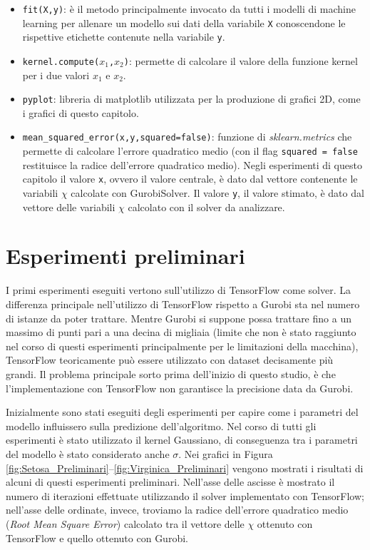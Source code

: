\documentclass[a4paper,12pt]{report}
\begin{document}
\begin{itemize}
\begin{itemize}
    \end{itemize}
    \item \texttt{fit(X,y)}: è il metodo principalmente invocato da tutti i modelli di machine learning per allenare un modello sui dati della variabile \texttt{X} conoscendone le rispettive etichette contenute nella variabile \texttt{y}.
    \item \texttt{kernel.compute($x_{1}$,$x_{2}$)}: permette di calcolare il valore della funzione kernel per i due valori $x_{1}$ e $x_{2}$.
    \item \texttt{pyplot}: libreria di matplotlib utilizzata per la produzione di grafici 2D, come i grafici di questo capitolo.
    \item \texttt{mean\_squared\_error(x,y,squared=false)}: funzione di \textit{sklearn.metrics} che permette di calcolare l'errore quadratico medio (con il flag \texttt{squared = false} restituisce la radice dell'errore quadratico medio). Negli esperimenti di questo capitolo il valore \texttt{x}, ovvero il valore centrale, è dato dal vettore contenente le variabili $\chi$ calcolate con GurobiSolver. Il valore \texttt{y}, il valore stimato, è dato dal vettore delle variabili $\chi$ calcolato con il solver da analizzare.
\end{itemize}

\section{Esperimenti preliminari}
I primi esperimenti eseguiti vertono sull'utilizzo di TensorFlow come solver. La differenza principale nell'utilizzo di TensorFlow rispetto a Gurobi sta nel numero di istanze da poter trattare. Mentre Gurobi si suppone possa trattare fino a un massimo di punti pari a una decina di migliaia (limite che non è stato raggiunto nel corso di questi esperimenti principalmente per le limitazioni della macchina), TensorFlow teoricamente può essere utilizzato con dataset decisamente più grandi. Il problema principale sorto prima dell'inizio di questo studio, è che l'implementazione con TensorFlow non garantisce la precisione data da Gurobi.

Inizialmente sono stati eseguiti degli esperimenti per capire come i parametri del modello influissero sulla predizione dell'algoritmo. Nel corso di tutti gli esperimenti è stato utilizzato il kernel Gaussiano, di conseguenza tra i parametri del modello è stato considerato anche $\sigma$. Nei grafici in Figura \ref{fig:Setosa_Preliminari}--\ref{fig:Virginica_Preliminari} vengono mostrati i risultati di alcuni di questi esperimenti preliminari. Nell'asse delle ascisse è mostrato il numero di iterazioni effettuate utilizzando il solver implementato con TensorFlow; nell'asse delle ordinate, invece, troviamo la radice dell'errore quadratico medio (\textit{Root Mean Square Error}) calcolato tra il vettore delle $\chi$ ottenuto con TensorFlow e quello ottenuto con Gurobi.
\end{document}
